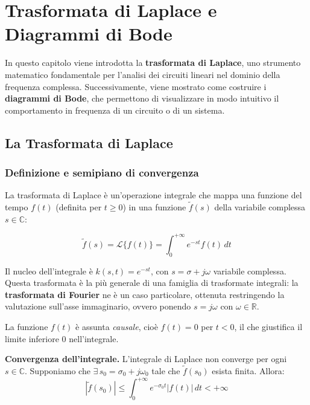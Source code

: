 \chapter{Trasformata di Laplace e Diagrammi di Bode}
\label{ch:laplace-bode}

In questo capitolo viene introdotta la \textbf{trasformata di Laplace}, uno strumento matematico fondamentale per l'analisi dei circuiti lineari nel dominio della frequenza complessa. Successivamente, viene mostrato come costruire i \textbf{diagrammi di Bode}, che permettono di visualizzare in modo intuitivo il comportamento in frequenza di un circuito o di un sistema.

\section{La Trasformata di Laplace}

\subsection{Definizione e semipiano di convergenza}

La trasformata di Laplace è un'operazione integrale che mappa una funzione del tempo $f(t)$ (definita per $t \geq 0$) in una funzione $\tilde{f}(s)$ della variabile complessa $s \in \mathbb{C}$:

\begin{important}
\[
    \tilde{f}(s) = \mathcal{L}\{f(t)\} = \int_0^{+\infty} e^{-st} f(t) \, dt
\]
\end{important}

Il nucleo dell'integrale è $k(s,t) = e^{-st}$, con $s = \sigma + j\omega$ variabile complessa. Questa trasformata è la più generale di una famiglia di trasformate integrali: la \textbf{trasformata di Fourier} ne è un caso particolare, ottenuta restringendo la valutazione sull'asse immaginario, ovvero ponendo $s = j\omega$ con $\omega \in \mathbb{R}$.

La funzione $f(t)$ è assunta \textit{causale}, cioè $f(t) = 0$ per $t < 0$, il che giustifica il limite inferiore $0$ nell'integrale.

\vspace{0.5em}
\noindent\textbf{Convergenza dell'integrale.} L'integrale di Laplace non converge per ogni $s \in \mathbb{C}$. Supponiamo che $\exists\, s_0 = \sigma_0 + j\omega_0$ tale che $\tilde{f}(s_0)$ esista finita. Allora:
\[
    |\tilde{f}(s_0)| \leq \int_0^{+\infty} e^{-\sigma_0 t} |f(t)| \, dt < +\infty
\]

